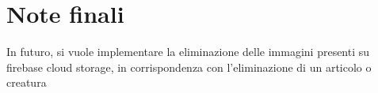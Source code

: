 \section{Note finali}

In futuro, si vuole implementare la eliminazione delle immagini presenti su firebase cloud storage, in corrispondenza con l'eliminazione di un articolo o creatura
